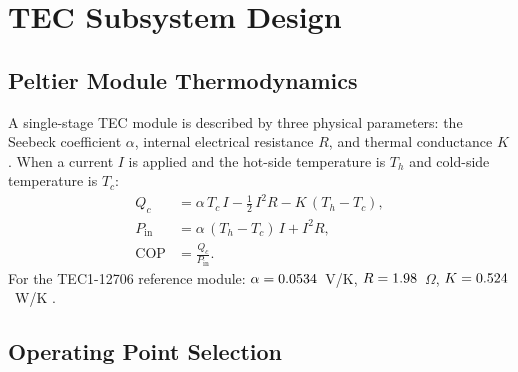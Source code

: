 \documentclass[12pt,a4paper]{report}   %
\begin{document}
\chapter{TEC Subsystem Design}
\label{ch:tec}

\section{Peltier Module Thermodynamics}

A single-stage TEC module is described by three physical parameters: the Seebeck coefficient
$\alpha$, internal electrical resistance $R$, and thermal conductance $K$ \cite{riffat2003peltier,
zhao2022teccondenser}. When a current $I$ is applied and the hot-side temperature is $T_h$ and
cold-side temperature is $T_c$:
\begin{align}
  Q_c &= \alpha\,T_c\,I - \tfrac{1}{2}\,I^2 R - K\,(T_h - T_c),
  \label{eq:Qc} \\
  P_{\mathrm{in}} &= \alpha\,(T_h - T_c)\,I + I^2 R,
  \label{eq:Pin} \\
  \mathrm{COP} &= \frac{Q_c}{P_{\mathrm{in}}}.
  \label{eq:COP}
\end{align}
For the TEC1-12706 reference module: $\alpha = 0.0534$~V/K, $R = 1.98$~$\Omega$,
$K = 0.524$~W/K \cite{eslami2021tec}.

\section{Operating Point Selection}
\end{document}
